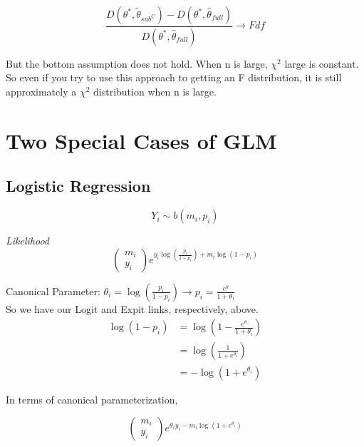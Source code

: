 \documentclass[11pt,fleqn]{book} %
\begin{document}
		$$ \frac{D(\theta^*, \tilde{\theta}_{sub^C}) - D(\theta^*, \hat{\theta}_{full}) }{D(\theta^*, \hat{\theta}_{full}) } \rightarrow F{df}$$

But the bottom assumption does not hold. When n is large, $\chi^2$ large is constant. So even if you try to use this approach to getting an F distribution, it is still approximately a $\chi^2$ distribution when n is large. \\




\chapter{Two Special Cases of GLM}

\section{Logistic Regression}

		$$Y_i \sim b(m_i, p_i) $$

\textit{Likelihood}\\

		$$\begin{pmatrix}
			m_i\\
			y_i
		\end{pmatrix} e^{y_i \log(\frac{p_i}{1- p_i}) + m_i \log(1 - p_i)} $$

Canonical Parameter: $\theta_i = \log(\frac{p_i}{1- p_i}) \rightarrow  p_i = \frac{e^\theta}{1 + \theta_i}$\\

So we have our Logit and Expit links, respectively, above. \\

\begin{align*}
	\log(1 - p_i) &= \log(1 - \frac{e^\theta}{1 + \theta_i})\\
		&= \log(\frac{1}{1 + e^{\theta_i}})\\
		&= - \log(1 + e^{\theta_i})
\end{align*}

In terms of canonical parameterization, 

		$$ \begin{pmatrix}
			m_i\\
			y_i
		\end{pmatrix} e^{\theta_i y_i - m_i \log(1 + e^{\theta_i})} $$
\end{document}
